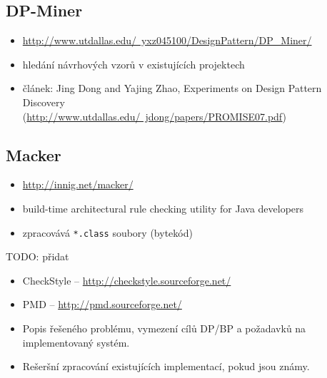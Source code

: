 \subsection{DP-Miner}
\begin{itemize}
\item \href{http://www.utdallas.edu/~yxz045100/DesignPattern/DP\_Miner/}{http://www.utdallas.edu/~yxz045100/DesignPattern/DP\_Miner/}
\item hledání návrhových vzorů v existujících projektech
\item článek: Jing Dong and Yajing Zhao, Experiments on Design Pattern Discovery \\ (\href{http://www.utdallas.edu/~jdong/papers/PROMISE07.pdf}{http://www.utdallas.edu/~jdong/papers/PROMISE07.pdf})
\end{itemize}

\subsection{Macker}
\begin{itemize}
\item \href{http://innig.net/macker/}{http://innig.net/macker/}
\item build-time architectural rule checking utility for Java developers
\item zpracovává \verb+*.class+ soubory (bytekód)
\end{itemize}

TODO: přidat

\begin{itemize}
\item CheckStyle -- \href{http://checkstyle.sourceforge.net/}{http://checkstyle.sourceforge.net/}
\item PMD -- \href{http://pmd.sourceforge.net/}{http://pmd.sourceforge.net/}
\end{itemize}



\begin{itemize}
\item Popis řešeného problému, vymezení cílů DP/BP a požadavků na implementovaný systém.

\item Rešeršní zpracování existujících implementací, pokud jsou známy.

\end{itemize}
